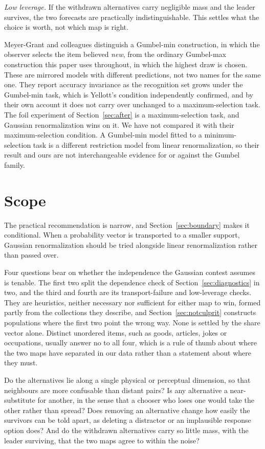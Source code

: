 \documentclass[11pt]{article}
\theoremstyle{italichead}
\begin{document}
\emph{Low leverage.} If the withdrawn alternatives carry negligible mass and the leader survives,
the two forecasts are practically indistinguishable. This settles what the choice is worth, not
which map is right.

Meyer-Grant and colleagues \cite{meyergrant2026} distinguish a Gumbel-min construction, in which the
observer selects the item believed \emph{new}, from the ordinary Gumbel-max construction this
paper uses throughout, in which the highest draw is chosen. These are mirrored models with
different predictions, not two names for the same one. They report accuracy invariance as the
recognition set grows under the Gumbel-min task, which is Yellott's condition independently
confirmed, and by their own account it does not carry over unchanged to a maximum-selection
task. The foil experiment of Section~\ref{sec:after} is a maximum-selection task, and Gaussian
renormalization wins on it. We have not compared it with their maximum-selection condition. A
Gumbel-min model fitted to a minimum-selection task is a different restriction model from linear
renormalization, so their result and ours are not interchangeable evidence for or against the
Gumbel family.


\section{Scope}
\label{sec:scope}

The practical recommendation is narrow, and Section~\ref{sec:boundary} makes it conditional.
When a probability vector is transported to a smaller support, Gaussian renormalization should be
tried alongside linear renormalization rather than passed over.

Four questions bear on whether the independence the Gaussian contest assumes is tenable. The
first two split the dependence check of Section~\ref{sec:diagnostics} in two, and the third and
fourth are its transport-failure and low-leverage checks. They are heuristics, neither necessary
nor sufficient for either map to win, formed partly from the collections they describe, and
Section~\ref{sec:notculprit} constructs populations where the first two point the wrong way.
None is settled by the share vector alone. Distinct unordered items, such as goods, articles,
jokes or occupations, usually answer no to all four, which is a rule of thumb about where the two
maps have separated in our data rather than a statement about where they must.

Do the alternatives lie along a single physical or perceptual dimension, so that neighbours
are more confusable than distant pairs? Is any alternative a near-substitute for another,
in the sense that a chooser who loses one would take the other rather than spread? Does
removing an alternative change how easily the survivors can be told apart, as deleting a
distractor or an implausible response option does? And do the withdrawn alternatives carry so little mass,
with the leader surviving, that the two maps agree to within the noise?
\end{document}

